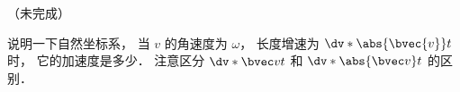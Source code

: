 
\begin{issues}
\issueDraft
\issueNeedCite
\end{issues}


（未完成）

说明一下自然坐标系， 当 $v$ 的角速度为 $\omega$， 长度增速为 $\dv*{\abs{\bvec{v}}}{t}$ 时， 它的加速度是多少． 注意区分 $\dv*{\bvec v}{t}$ 和 $\dv*{\abs{\bvec v}}{t}$ 的区别．
